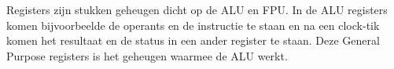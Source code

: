 Registers zijn stukken geheugen dicht op de ALU en FPU. In de ALU registers komen bijvoorbeelde de operants en de instructie te staan en na een clock-tik komen het resultaat en de status in een ander register te staan. Deze General Purpose registers is het geheugen waarmee de ALU werkt.

